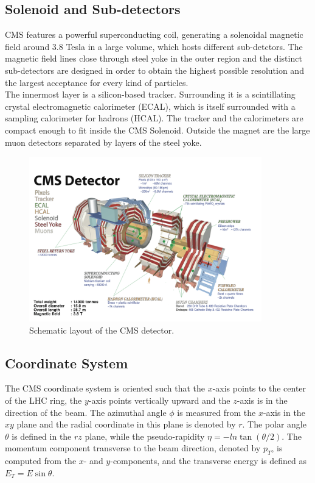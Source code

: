 \subsection*{Solenoid and Sub-detectors}
CMS features a powerful superconducting coil, generating a solenoidal magnetic field around 3.8 Tesla in a large volume, which hosts different sub-detctors. The magnetic field lines close through steel yoke in the outer region and the distinct sub-detectors are designed in order to obtain the highest possible resolution and the largest acceptance for every kind of particles.\\
The innermost layer is a silicon-based tracker. Surrounding it is a scintillating crystal electromagnetic calorimeter (ECAL), which is itself surrounded with a sampling calorimeter for hadrons (HCAL). The tracker and the calorimeters are compact enough to fit inside the CMS Solenoid. Outside the magnet are the large muon detectors separated by layers of the steel yoke.\\
\begin{figure}[hbtp]
  \begin{center}
    \includegraphics[width=0.9\textwidth]{figure/CH2/CMS.png}
  \end{center}
  \caption{\label{fig:CMS}Schematic layout of the CMS detector.}
\end{figure}
\subsection*{Coordinate System}
The CMS coordinate system is oriented such that the $x$-axis points to the center of the LHC ring, the $y$-axis points vertically upward and the $z$-axis is in the direction of the beam. The azimuthal angle $\phi$ is measured from the $x$-axis in the $xy$ plane and the radial coordinate in this plane is denoted by $r$. The polar angle $\theta$ is defined in the $rz$ plane, while the pseudo-rapidity $\eta=-ln\tan{(\theta/2)}$. The momentum component transverse to the beam direction, denoted by $p_{T}$, is computed from the $x$- and $y$-components, and the transverse energy is defined as $E_{T}=E\sin\theta$.


